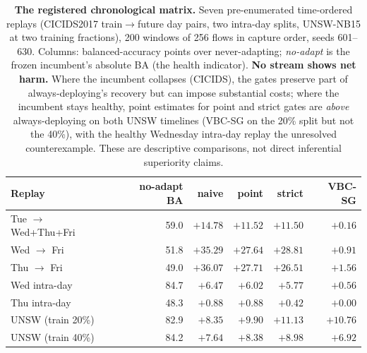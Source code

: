 \begin{table}[t]
\centering
\caption{\textbf{The registered chronological matrix.} Seven pre-enumerated
time-ordered replays (CICIDS2017 train$\to$future day pairs, two intra-day splits, UNSW-NB15
at two training fractions), 200 windows of 256 flows in capture order, seeds 601--630.
Columns: balanced-accuracy points over never-adapting; \emph{no-adapt} is the frozen
incumbent's absolute BA (the health indicator). \textbf{No stream shows net harm.} Where
the incumbent collapses (CICIDS), the gates preserve part of always-deploying's recovery
but can impose substantial costs; where the incumbent stays healthy, point estimates for
point and strict gates are \emph{above} always-deploying on both UNSW
timelines (VBC-SG on the 20\% split but not the 40\%), with the healthy Wednesday intra-day
replay the unresolved counterexample. These are descriptive comparisons, not direct
inferential superiority claims.}
\label{tab:chronological_q1}
\small
\begin{tabular}{l r r r r r}
\toprule
Replay & no-adapt BA & naive & point & strict & VBC-SG \\
\midrule
Tue $\to$ Wed+Thu+Fri & 59.0 & $+14.78$ & $+11.52$ & $+11.50$ & $+0.16$ \\
Wed $\to$ Fri & 51.8 & $+35.29$ & $+27.64$ & $+28.81$ & $+0.91$ \\
Thu $\to$ Fri & 49.0 & $+36.07$ & $+27.71$ & $+26.51$ & $+1.56$ \\
Wed intra-day & 84.7 & $+6.47$ & $+6.02$ & $+5.77$ & $+0.56$ \\
Thu intra-day & 48.3 & $+0.88$ & $+0.88$ & $+0.42$ & $+0.00$ \\
UNSW (train 20\%) & 82.9 & $+8.35$ & $+9.90$ & $+11.13$ & $+10.76$ \\
UNSW (train 40\%) & 84.2 & $+7.64$ & $+8.38$ & $+8.98$ & $+6.92$ \\
\bottomrule
\end{tabular}
\end{table}
